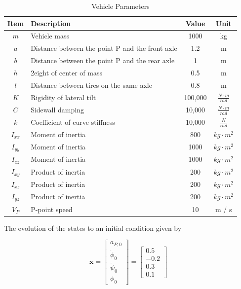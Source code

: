 \documentclass[sublist,a4paper,twoside,11pt]{article}
\begin{document}
\begin{table}[h]	
	\centering
	\caption{Vehicle Parameters}	\label{table:Vehicle.Parameters}
	\begin{tabular}{|c|l|c|c|}
		\hline
Item & Description & Value & Unit \\
\hline
$m$ & Vehicle mass & 1000 & kg\\
$a$ & Distance between the point P and the front axle & 1.2 & m\\
$b$ & Distance between the point P and the rear axle & 1 & m\\
$h$ & 2eight of center of mass & 0.5 & m\\
$l$ & Distance between tires on the same axle & 0.8 & m\\
$K$ & Rigidity of lateral tilt & 100,000 & $\frac{N\cdot  m}{ rad}$\\
$C$ & Sidewall damping & 10,000 & $\frac{N \cdot m}{ rad}$\\
$k$ & Coefficient of curve stiffness & 10,000 & $\frac{N}{ rad}$\\
$I_{xx}$ & Moment of inertia & 800 & $kg\cdot m^2$\\
$I_{yy}$ & Moment of inertia & 1000 & $kg\cdot m^2$\\
$I_{zz}$ & Moment of inertia & 1000 & $kg\cdot m^2$\\
$I_{xy}$ & Product of inertia & 200 & $kg\cdot m^2$\\
$I_{xz}$ & Product of inertia & 200 & $kg\cdot m^2$\\
$I_{yz}$ & Product of inertia & 200 & $kg\cdot m^2$\\
$V_P$ & P-point speed & 10 & m / s\\
\hline
	\end{tabular}
\end{table}


The evolution of the states to an initial condition given by

\begin{equation}\mathbf{x}=
\begin{bmatrix}
a_{P,0}\\
\dot{\phi}_{0}\\
\dot{\psi}_{0}\\
\phi_{0}
\end{bmatrix}  = 
\begin{bmatrix}
0.5\\
-0.2\\
0.3\\
0.1
\end{bmatrix}
\end{equation}
\end{document}
